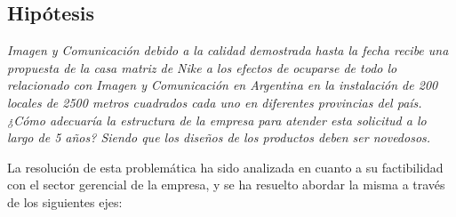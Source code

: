 \documentclass[a4paper,10pt,titlepage]{article}
\begin{document}

\newpage
\subsection{Hipótesis}
\vspace{1cm}
\indent \textit{Imagen y Comunicación debido a la calidad demostrada hasta la fecha recibe una propuesta de la casa matriz de Nike a los efectos de ocuparse de todo lo relacionado con Imagen y Comunicación en Argentina en la instalación de 200 locales de 2500 metros cuadrados cada uno en diferentes provincias del país. ¿Cómo adecuaría la estructura de la empresa para atender esta solicitud a lo largo de 5 años? Siendo que los diseños de los productos deben ser novedosos.}\\
\vspace{1cm}

\indent La resoluci\'on de esta problem\'atica ha sido analizada en cuanto a su factibilidad con el sector gerencial de la empresa, y se ha resuelto abordar la misma a trav\'es de los siguientes ejes:\\
\end{document}
